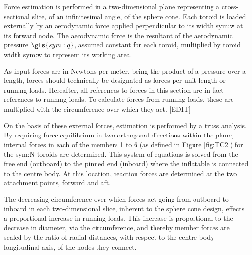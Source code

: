 Force estimation is performed in a two-dimensional plane representing a cross-sectional slice, of an infinitesimal angle, of the sphere cone. Each toroid is loaded externally by an aerodynamic force applied perpendicular to its width \gls{sym:w} at its forward node. The aerodynamic force is the resultant of the aerodynamic pressure $\gls{sym:q}$, assumed constant for each toroid, multiplied by toroid width \gls{sym:w} to represent its working area. 


As input forces are in Newtons per meter, being the product of a pressure over a length, forces should technically be designated as forces per unit length or running loads. Hereafter, all references to forces in this section are in fact references to running loads. To calculate forces from running loads, these are multiplied with the circumference over which they act. [EDIT]

On the basis of these external forces, estimation is performed by a truss analysis. By requiring force equilibrium in two orthogonal directions within the plane, internal forces in each of the members 1 to 6 (as defined in Figure \ref{fig:TC2}) for the \gls{sym:N} toroids are determined. This system of equations is solved from the free end (outboard) to the pinned end (inboard) where the inflatable is connected to the centre body. At this location, reaction forces are determined at the two attachment points, forward and aft.

The decreasing circumference over which forces act going from outboard to inboard in each two-dimensional slice, inherent to the sphere cone design, effects a proportional increase in running loads. This increase is proportional to the decrease in diameter, via the circumference, and thereby member forces are scaled by the ratio of radial distances, with respect to the centre body longitudinal axis, of the nodes they connect.

